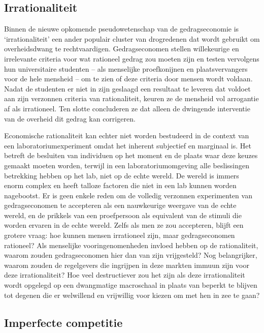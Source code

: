 \documentclass[
  a5paper,
  smalldemyvopaper,11pt,twoside,onecolumn,openright,extrafontsizes,
hidelinks]{memoir}
\begin{document}
\subsection{Irrationaliteit}\label{irrationaliteit}

Binnen de nieuwe opkomende pseudowetenschap van de gedragseconomie is
`irrationaliteit' een ander populair cluster van drogredenen dat wordt
gebruikt om overheidsdwang te rechtvaardigen. Gedragseconomen stellen
willekeurige en irrelevante criteria voor wat rationeel gedrag zou
moeten zijn en testen vervolgens hun universitaire studenten -- als
menselijke proefkonijnen en plaatsvervangers voor de hele mensheid -- om
te zien of deze criteria door mensen wordt voldaan. Nadat de studenten
er niet in zijn geslaagd een resultaat te leveren dat voldoet aan zijn
verzonnen criteria van rationaliteit, keuren ze de mensheid vol
arrogantie af als irrationeel. Ten slotte concluderen ze dat alleen de
dwingende interventie van de overheid dit gedrag kan corrigeren.

Economische rationaliteit kan echter niet worden bestudeerd in de
context van een laboratoriumexperiment omdat het inherent subjectief en
marginaal is. Het betreft de besluiten van individuen op het moment en
de plaats waar deze keuzes gemaakt moeten worden, terwijl in een
laboratoriumomgeving alle beslissingen betrekking hebben op het lab,
niet op de echte wereld. De wereld is immers enorm complex en heeft
talloze factoren die niet in een lab kunnen worden nagebootst. Er is
geen enkele reden om de volledig verzonnen experimenten van
gedragseconomen te accepteren als een nauwkeurige weergave van de echte
wereld, en de prikkels van een proefpersoon als equivalent van de
stimuli die worden ervaren in de echte wereld. Zelfs als men ze zou
accepteren, blijft een grotere vraag: hoe kunnen mensen irrationeel
zijn, maar gedragseconomen rationeel? Als menselijke vooringenomenheden
invloed hebben op de rationaliteit, waarom zouden gedragseconomen hier
dan van zijn vrijgesteld? Nog belangrijker, waarom zouden de regelgevers
die ingrijpen in deze markten immuun zijn voor deze irrationaliteit? Hoe
veel destructiever zou het zijn als deze irrationaliteit wordt opgelegd
op een dwangmatige macroschaal in plaats van beperkt te blijven tot
degenen die er welwillend en vrijwillig voor kiezen om met hen in zee te
gaan?

\subsection{Imperfecte competitie}\label{imperfecte-competitie}
\end{document}
